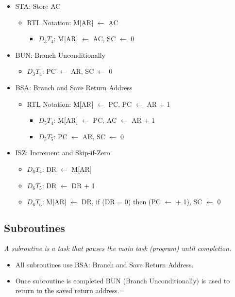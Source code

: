 \documentclass[11pt]{article}
\begin{document}
\begin{itemize}
  \item STA: Store AC
  \begin{itemize}
    \item RTL Notation: M[AR] $\leftarrow$ AC
    \begin{itemize}
      \item $D_3$$T_4$: M[AR] $\leftarrow$ AC, SC $\leftarrow$ 0
    \end{itemize}
  \end{itemize}

  \item BUN: Branch Unconditionally
  \begin{itemize}
    \item $D_3$$T_4$: PC $\leftarrow$ AR, SC $\leftarrow$ 0
  \end{itemize}

  \item BSA: Branch and Save Return Address
  \begin{itemize}
    \item RTL Notation: M[AR] $\leftarrow$ PC, PC $\leftarrow$ AR + 1
    \begin{itemize}
      \item $D_5$$T_4$: M[AR] $\leftarrow$ PC, AC $\leftarrow$ AR + 1
      \item $D_5$$T_5$: PC $\leftarrow$ AR, SC $\leftarrow$ 0
    \end{itemize}
  \end{itemize}

  \item ISZ: Increment and Skip-if-Zero
  \begin{itemize}
    \item $D_6$$T_4$: DR $\leftarrow$ M[AR]
    \item $D_6$$T_5$: DR $\leftarrow$ DR + 1
    \item $D_6$$T_6$: M[AR] $\leftarrow$ DR, if (DR = 0) then (PC $\leftarrow$ + 1), SC $\leftarrow$ 0
  \end{itemize}

\end{itemize}

\subsection{Subroutines}
\textit{A subroutine is a task that pauses the main task (program) until completion.}
\begin{itemize}
  \item All subroutines use BSA: Branch and Save Return Address.
  \item Once subroutine is completed BUN (Branch Unconditionally) is used to return to the saved return address.=
\end{itemize}
\end{document}
